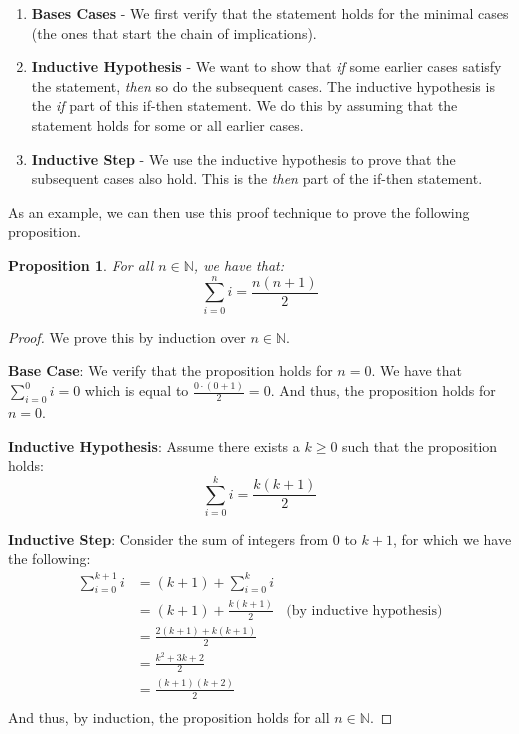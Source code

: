 \documentclass{article}
\newcommand{\N}{\mathbb{N}}
\theoremstyle{plain}
\newtheorem{prop}{Proposition}
\theoremstyle{definition}
\begin{document}
\begin{enumerate}
    \item \textbf{Bases Cases} - We first verify that the statement holds for the minimal cases (the ones that start the chain of implications).
    \item \textbf{Inductive Hypothesis} - We want to show that \emph{if} some earlier cases satisfy the statement, \emph{then} so do the subsequent cases. The inductive hypothesis is the \emph{if} part of this if-then statement. We do this by assuming that the statement holds for some or all earlier cases.
    \item \textbf{Inductive Step} - We use the inductive hypothesis to prove that the subsequent cases also hold. This is the \emph{then} part of the if-then statement.
\end{enumerate}

As an example, we can then use this proof technique to prove the following proposition.

\begin{prop}
    For all \(n \in \N\), we have that:
    \[\sum_{i=0}^n i = \frac{n(n+1)}{2}\]
\end{prop}
\begin{proof}
    We prove this by induction over \(n \in \N\).
    
    \textbf{Base Case}: We verify that the proposition holds for \(n=0\). We have that \(\sum_{i=0}^0 i = 0\) which is equal to \(\frac{0 \cdot (0 + 1)}{2} = 0\). And thus, the proposition holds for \(n=0\).

    \textbf{Inductive Hypothesis}: Assume there exists a \(k \geq 0\) such that the proposition holds:
    \[\sum_{i=0}^k i = \frac{k(k+1)}{2}\]

    \textbf{Inductive Step}: Consider the sum of integers from \(0\) to \(k+1\), for which we have the following:
    \begin{align*}
        \sum_{i=0}^{k+1} i &= (k+1) + \sum_{i = 0}^{k} i \\
        &= (k+1) + \frac{k(k+1)}{2}\ \ \ \ \text{(by inductive hypothesis)} \\
        &= \frac{2(k+1) + k(k+1)}{2} \\
        &= \frac{k^2 + 3k + 2}{2} \\ 
        &= \frac{(k+1)(k+2)}{2} \\ 
    \end{align*}
    And thus, by induction, the proposition holds for all \(n \in \N\).
\end{proof}
\end{document}
